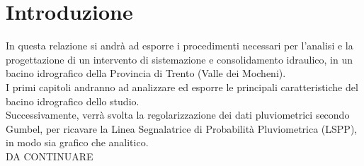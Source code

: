 \section{Introduzione}
In questa relazione si andrà ad esporre i procedimenti necessari per l'analisi e la progettazione di un intervento di sistemazione e consolidamento idraulico, in un bacino idrografico della Provincia di Trento (Valle dei Mocheni).\\
I primi capitoli andranno ad analizzare ed esporre le principali caratteristiche del bacino idrografico dello studio.\\
Successivamente, verrà svolta la regolarizzazione dei dati pluviometrici secondo Gumbel, per ricavare la Linea Segnalatrice di Probabilità Pluviometrica (LSPP), in modo sia grafico che analitico.\\ 
DA CONTINUARE 
